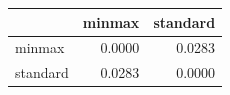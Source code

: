 \begin{tabular}{lrr}
\toprule
 & minmax & standard \\
\midrule
minmax & 0.0000 & 0.0283 \\
standard & 0.0283 & 0.0000 \\
\bottomrule
\end{tabular}
